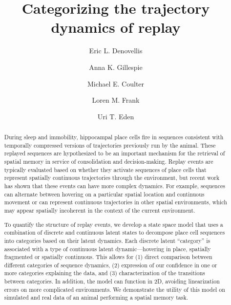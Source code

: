\documentclass[times, twoside, watermark]{zHenriquesLab-StyleBioRxiv}
\begin{document}
\title{Categorizing the trajectory dynamics of replay}

\author[1,\Letter]{Eric L. Denovellis}
\author[2, 3]{Anna K. Gillespie}
\author[2, 3]{Michael E. Coulter}
\author[2, 3, 4]{Loren M. Frank}
\author[1]{Uri T. Eden}


\maketitle

\begin{abstract}
During sleep and immobility, hippocampal place cells fire in sequences consistent with temporally compressed versions of trajectories previously run by the animal. These replayed sequences are hypothesized to be an important mechanism for the retrieval of spatial memory in service of consolidation and decision-making. Replay events are typically evaluated based on whether they activate sequences of place cells that represent spatially continuous trajectories through the environment, but recent work has shown that these events can have more complex dynamics. For example, sequences can alternate between hovering on a particular spatial location and continuous movement or can represent continuous trajectories in other spatial environments, which may appear spatially incoherent in the context of the current environment.
 
To quantify the structure of replay events, we develop a state space model that uses a combination of discrete and continuous latent states to decompose place cell sequences into categories based on their latent dynamics. Each discrete latent “category” is associated with a type of continuous latent dynamic—hovering in place, spatially fragmented or spatially continuous. This allows for (1) direct comparison between different categories of sequence dynamics, (2) expression of our confidence in one or more categories explaining the data, and (3) characterization of the transitions between categories. In addition, the model can function in 2D, avoiding linearization errors on more complicated environments. We demonstrate the utility of this model on simulated and real data of an animal performing a spatial memory task.

\end {abstract}
\end{document}

